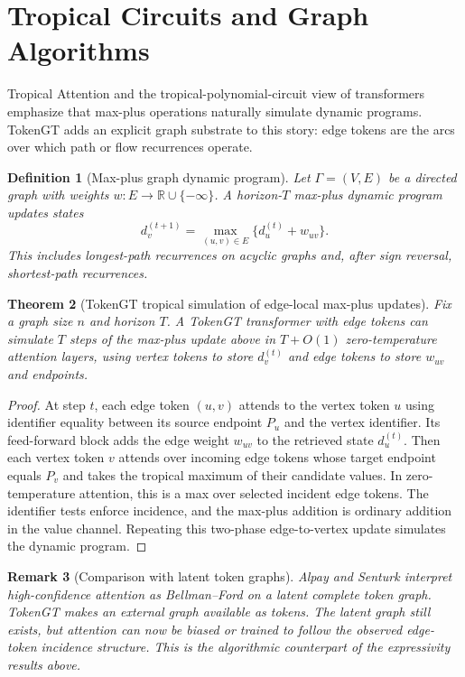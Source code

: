 \documentclass[11pt]{article}
\newtheorem{theorem}{Theorem}[section]
\newtheorem{definition}[theorem]{Definition}
\newtheorem{remark}[theorem]{Remark}
\newcommand{\R}{\mathbb{R}}
\begin{document}
\section{Tropical Circuits and Graph Algorithms}

Tropical Attention \cite{hashemi2025tropicalattention} and the tropical-polynomial-circuit view of transformers \cite{alpay2026geometry} emphasize that max-plus operations naturally simulate dynamic programs.  TokenGT adds an explicit graph substrate to this story: edge tokens are the arcs over which path or flow recurrences operate.

\begin{definition}[Max-plus graph dynamic program]
Let $\Gamma=(V,E)$ be a directed graph with weights $w:E\to \R\cup\{-\infty\}$.  A horizon-$T$ max-plus dynamic program updates states
\[
  d_v^{(t+1)}
  =
  \max_{(u,v)\in E}\{d_u^{(t)}+w_{uv}\}.
\]
This includes longest-path recurrences on acyclic graphs and, after sign reversal, shortest-path recurrences.
\end{definition}

\begin{theorem}[TokenGT tropical simulation of edge-local max-plus updates]
\label{thm:maxplus}
Fix a graph size $n$ and horizon $T$.  A TokenGT transformer with edge tokens can simulate $T$ steps of the max-plus update above in $T+O(1)$ zero-temperature attention layers, using vertex tokens to store $d_v^{(t)}$ and edge tokens to store $w_{uv}$ and endpoints.
\end{theorem}

\begin{proof}
At step $t$, each edge token $(u,v)$ attends to the vertex token $u$ using identifier equality between its source endpoint $P_u$ and the vertex identifier.  Its feed-forward block adds the edge weight $w_{uv}$ to the retrieved state $d_u^{(t)}$.  Then each vertex token $v$ attends over incoming edge tokens whose target endpoint equals $P_v$ and takes the tropical maximum of their candidate values.  In zero-temperature attention, this is a max over selected incident edge tokens.  The identifier tests enforce incidence, and the max-plus addition is ordinary addition in the value channel.  Repeating this two-phase edge-to-vertex update simulates the dynamic program.
\end{proof}

\begin{remark}[Comparison with latent token graphs]
Alpay and Senturk \cite{alpay2026geometry} interpret high-confidence attention as Bellman--Ford on a latent complete token graph.  TokenGT makes an external graph available as tokens.  The latent graph still exists, but attention can now be biased or trained to follow the observed edge-token incidence structure.  This is the algorithmic counterpart of the expressivity results above.
\end{remark}
\end{document}
